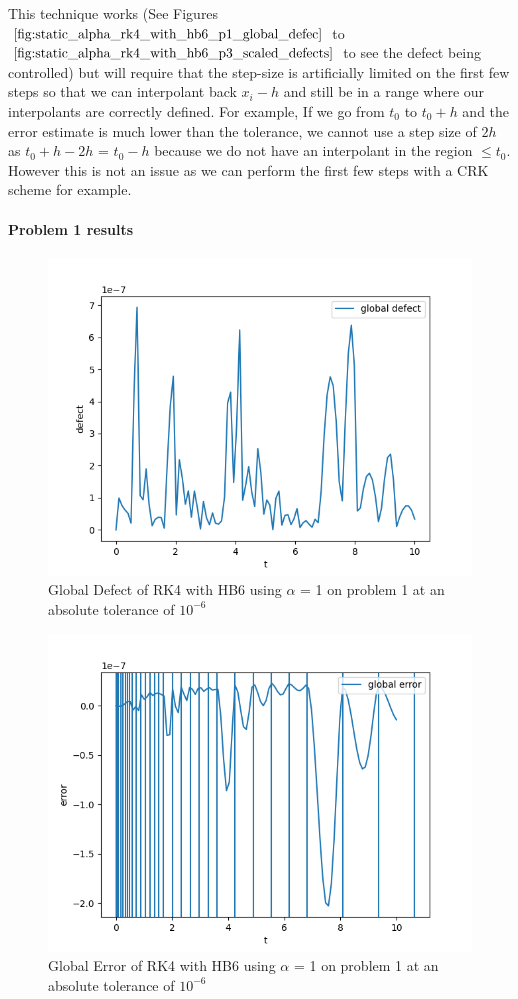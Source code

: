 \documentclass{article}
\begin{document}
This technique works (See Figures $\ref{fig:static_alpha_rk4_with_hb6_p1_global_defec}$ to $\ref{fig:static_alpha_rk4_with_hb6_p3_scaled_defects}$ to see the defect being controlled) but will require that the step-size is artificially limited on the first few steps so that we can interpolant back $x_i - h$ and still be in a range where our interpolants are correctly defined. For example, If we go from $t_0$ to $t_0 + h$ and the error estimate is much lower than the tolerance, we cannot use a step size of $2h$ as $t_0 + h - 2h$ = $t_0-h$ because we do not have an interpolant in the region $\leq t_0$. However this is not an issue as we can perform the first few steps with a CRK scheme for example.

\paragraph{Problem 1 results}
\begin{figure}[H]
\centering
\includegraphics[width=0.7\linewidth]{./figures/static_alpha_rk4_with_hb6_p1_global_defect}
\caption{Global Defect of RK4 with HB6 using $\alpha$ = 1 on problem 1 at an absolute tolerance of $10^{-6}$}
\label{fig:static_alpha_rk4_with_hb6_p1_global_defect}
\end{figure}

\begin{figure}[H]
\centering
\includegraphics[width=0.7\linewidth]{./figures/static_alpha_rk4_with_hb6_p1_global_error}
\caption{Global Error of RK4 with HB6 using $\alpha$ = 1 on problem 1 at an absolute tolerance of $10^{-6}$}
\label{fig:static_alpha_rk4_with_hb6_p1_global_error}
\end{figure}
\end{document}

